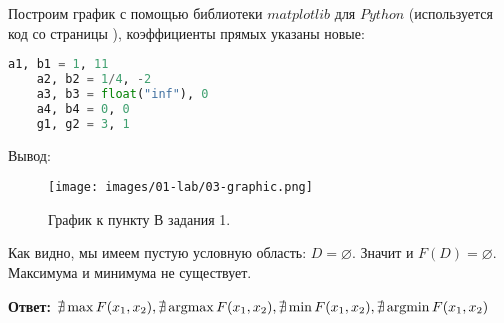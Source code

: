 Построим график с помощью библиотеки $matplotlib$ для $Python$ (используется код со страницы \pageref{code: 01-lab-01-code}), коэффициенты прямых указаны новые:
\begin{lstlisting}[language=Python]
    a1, b1 = 1, 11
    a2, b2 = 1/4, -2
    a3, b3 = float("inf"), 0
    a4, b4 = 0, 0
    g1, g2 = 3, 1
\end{lstlisting}
Вывод:
\begin{figure}[H]
    \texttt{[image: images/01-lab/03-graphic.png]}
    \caption{График к пункту В задания 1.}
    \label{fig:01-lab-03-graphic}
\end{figure}

Как видно, мы имеем пустую условную область: $D = \varnothing$. Значит и $F(D) = \varnothing$. Максимума и минимума не существует.

\textbf{Ответ:} $\nexists\max F(x_1, x_2), \nexists\operatorname*{argmax} F(x_1, x_2), \nexists\min F(x_1, x_2), \nexists\operatorname*{argmin} F(x_1, x_2)$

\newpage

